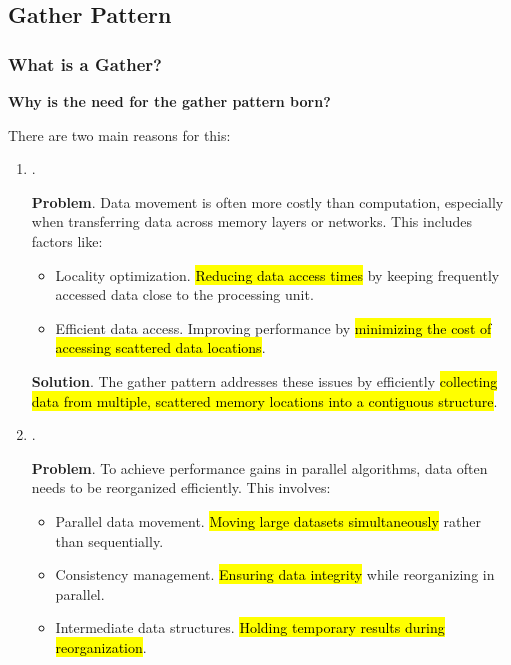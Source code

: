 \subsection{Gather Pattern}

\subsubsection{What is a Gather?}\label{subsubsection: What is a Gather}

\begin{flushleft}
    \textcolor{Green3}{ \textbf{Why is the need for the gather pattern born?}}
\end{flushleft}
There are two main reasons for this:
\begin{enumerate}
    \item {}.

    \textcolor{Red2}{ \textbf{Problem}}. Data movement is often more costly than computation, especially when transferring data across memory layers or networks. This includes factors like:
    \begin{itemize}
        \item Locality optimization. \hl{Reducing data access times} by keeping frequently accessed data close to the processing unit.
        \item Efficient data access. Improving performance by \hl{minimizing the cost of accessing scattered data locations}.
    \end{itemize}

    \textcolor{Green3}{ \textbf{Solution}}. The gather pattern addresses these issues by efficiently \hl{collecting data from multiple, scattered memory locations into a contiguous structure}.


    \item {}.
    
    \textcolor{Red2}{ \textbf{Problem}}. To achieve performance gains in parallel algorithms, data often needs to be reorganized efficiently. This involves:
    \begin{itemize}
        \item Parallel data movement. \hl{Moving large datasets simultaneously} rather than sequentially.
        \item Consistency management. \hl{Ensuring data integrity} while reorganizing in parallel.
        \item Intermediate data structures. \hl{Holding temporary results during reorganization}.
    \end{itemize}


\end{enumerate}
